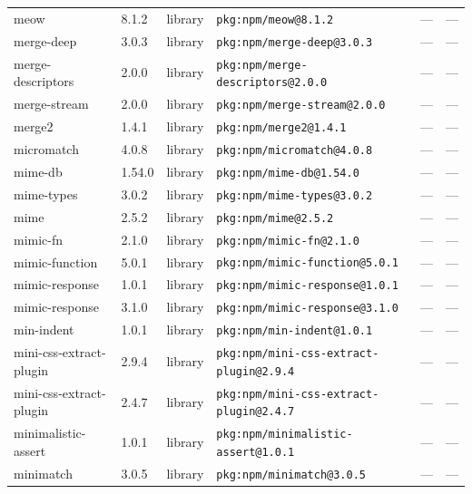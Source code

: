\documentclass[11pt,a4paper]{article}
\begin{document}
\begin{longtable}{|p{4cm}|p{2cm}|p{1.6cm}|p{5cm}|p{1.5cm}|p{3.5cm}|}
\raggedright meow & 8.1.2 & library & \small\texttt{pkg:npm/meow@8.1.2} & — & \small — \\
\raggedright merge-deep & 3.0.3 & library & \small\texttt{pkg:npm/merge-deep@3.0.3} & — & \small — \\
\raggedright merge-descriptors & 2.0.0 & library & \small\texttt{pkg:npm/merge-descriptors@2.0.0} & — & \small — \\
\raggedright merge-stream & 2.0.0 & library & \small\texttt{pkg:npm/merge-stream@2.0.0} & — & \small — \\
\raggedright merge2 & 1.4.1 & library & \small\texttt{pkg:npm/merge2@1.4.1} & — & \small — \\
\raggedright micromatch & 4.0.8 & library & \small\texttt{pkg:npm/micromatch@4.0.8} & — & \small — \\
\raggedright mime-db & 1.54.0 & library & \small\texttt{pkg:npm/mime-db@1.54.0} & — & \small — \\
\raggedright mime-types & 3.0.2 & library & \small\texttt{pkg:npm/mime-types@3.0.2} & — & \small — \\
\raggedright mime & 2.5.2 & library & \small\texttt{pkg:npm/mime@2.5.2} & — & \small — \\
\raggedright mimic-fn & 2.1.0 & library & \small\texttt{pkg:npm/mimic-fn@2.1.0} & — & \small — \\
\raggedright mimic-function & 5.0.1 & library & \small\texttt{pkg:npm/mimic-function@5.0.1} & — & \small — \\
\raggedright mimic-response & 1.0.1 & library & \small\texttt{pkg:npm/mimic-response@1.0.1} & — & \small — \\
\raggedright mimic-response & 3.1.0 & library & \small\texttt{pkg:npm/mimic-response@3.1.0} & — & \small — \\
\raggedright min-indent & 1.0.1 & library & \small\texttt{pkg:npm/min-indent@1.0.1} & — & \small — \\
\raggedright mini-css-extract-plugin & 2.9.4 & library & \small\texttt{pkg:npm/mini-css-extract-plugin@2.9.4} & — & \small — \\
\raggedright mini-css-extract-plugin & 2.4.7 & library & \small\texttt{pkg:npm/mini-css-extract-plugin@2.4.7} & — & \small — \\
\raggedright minimalistic-assert & 1.0.1 & library & \small\texttt{pkg:npm/minimalistic-assert@1.0.1} & — & \small — \\
\raggedright minimatch & 3.0.5 & library & \small\texttt{pkg:npm/minimatch@3.0.5} & — & \small — \\

\end{longtable}
\end{document}
